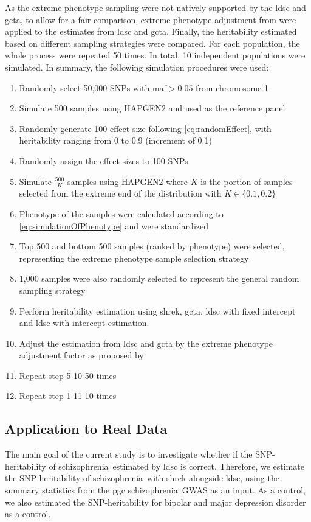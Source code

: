 \documentclass[12pt]{scrbook}
\newcommand*{\scz}{schizophrenia}
\begin{document}
As the extreme phenotype sampling were not natively supported by the \gls{ldsc} and \gls{gcta}, to allow for a fair comparison, extreme phenotype adjustment from \citet{Sham2014} were applied to the estimates from \gls{ldsc} and \gls{gcta}.
Finally, the heritability estimated based on different sampling strategies were compared.
For each population, the whole process were repeated 50 times. 
In total, 10 independent populations were simulated. 
In summary, the following simulation procedures were used:
\begin{enumerate}
	\item Randomly select 50,000 \glspl{SNP} with \gls{maf}$>0.05$ from chromosome 1
	\item Simulate 500 samples using HAPGEN2 and used as the reference panel
	\item Randomly generate 100 effect size following \cref{eq:randomEffect}, with heritability ranging from 0 to 0.9 (increment of 0.1)
	\item Randomly assign the effect sizes to 100 \glspl{SNP}
	\item Simulate $\frac{500}{K}$ samples using HAPGEN2 where $K$ is the portion of samples selected from the extreme end of the distribution with $K\in\{0.1,0.2\}$
	\item Phenotype of the samples were calculated according to \cref{eq:simulationOfPhenotype} and were standardized
	\item Top 500 and bottom 500 samples (ranked by phenotype) were selected, representing the extreme phenotype sample selection strategy
	\item 1,000 samples were also randomly selected to represent the general random sampling strategy
	\item Perform heritability estimation using \gls{shrek}, \gls{gcta}, \gls{ldsc} with fixed intercept and \gls{ldsc} with intercept estimation.
	\item Adjust the estimation from \gls{ldsc} and \gls{gcta} by the extreme phenotype adjustment factor as proposed by \citet{Sham2014}
	\item Repeat step 5-10 50 times
	\item Repeat step 1-11 10 times
\end{enumerate}

\subsection{Application to Real Data}
\label{sec:realData}
The main goal of the current study is to investigate whether if the \gls{SNP}-heritability of \scz\ estimated by \gls{ldsc} is correct.
Therefore, we estimate the \gls{SNP}-heritability of \scz\ with \gls{shrek} alongside \gls{ldsc}, using the summary statistics from the \gls{pgc} \scz\ \gls{GWAS} \citep{Ripke2014} as an input. 
As a control, we also estimated the \gls{SNP}-heritability for bipolar and major depression disorder \citep{PsychiatricGWASConsortiumBipolarDisorderWorkingGroup2011,Ripke2013b} as a control.
\end{document}
